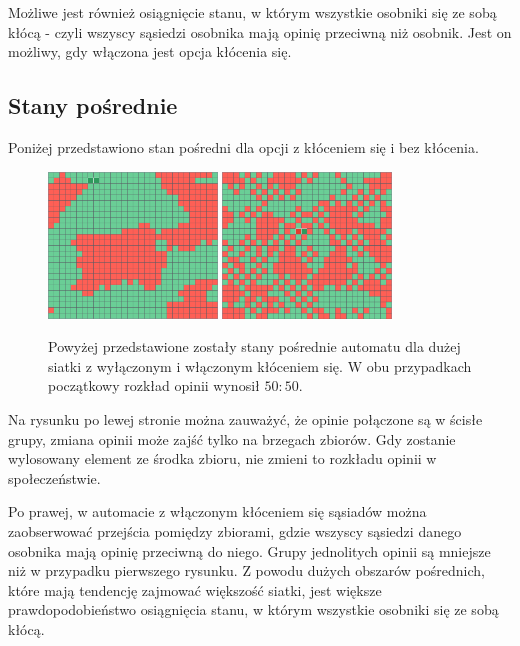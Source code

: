 \documentclass[12pt]{article}
\begin{document}
Możliwe jest również osiągnięcie stanu, w którym wszystkie osobniki się ze sobą kłócą - czyli wszyscy sąsiedzi osobnika mają opinię przeciwną niż osobnik. Jest on możliwy, gdy włączona jest opcja kłócenia się.

\subsection{Stany pośrednie}

Poniżej przedstawiono stan pośredni dla opcji z kłóceniem się i bez kłócenia.

\begin{figure}[H]
\centering
\includegraphics[width=0.4\textwidth]{sym_bez.png} \quad
\includegraphics[width=0.4\textwidth]{sym_klocenie.png}
\caption{Powyżej przedstawione zostały stany pośrednie automatu dla dużej siatki z wyłączonym i włączonym kłóceniem się. W obu przypadkach początkowy rozkład opinii wynosił $50:50$. }
\end{figure}

Na rysunku po lewej stronie można zauważyć, że opinie połączone są w ścisłe grupy, zmiana opinii może zajść tylko na brzegach zbiorów. Gdy zostanie wylosowany element ze środka zbioru, nie zmieni to rozkładu opinii w społeczeństwie.

Po prawej, w automacie z włączonym kłóceniem się sąsiadów można zaobserwować przejścia pomiędzy zbiorami, gdzie wszyscy sąsiedzi danego osobnika mają opinię przeciwną do niego. Grupy jednolitych opinii są mniejsze niż w przypadku pierwszego rysunku. Z powodu dużych obszarów pośrednich, które mają tendencję zajmować większość siatki, jest większe prawdopodobieństwo osiągnięcia stanu, w którym wszystkie osobniki się ze sobą kłócą.
\end{document}
